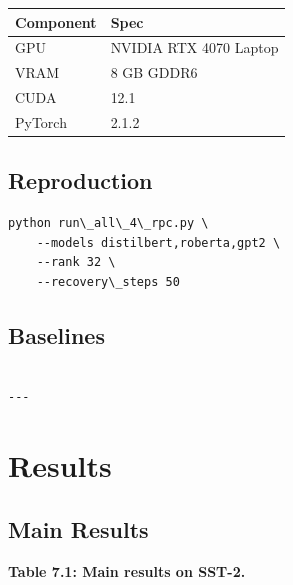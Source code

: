\begin{table}[H]
\centering
\small
\begin{tabular}{ll}
\toprule
\textbf{Component} & \textbf{Spec} \\
\midrule
GPU & NVIDIA RTX 4070 Laptop \\
VRAM & 8 GB GDDR6 \\
CUDA & 12.1 \\
PyTorch & 2.1.2 \\
\bottomrule
\end{tabular}
\end{table}

\subsection{Reproduction}

\begin{lstlisting}
python run\_all\_4\_rpc.py \
    --models distilbert,roberta,gpt2 \
    --rank 32 \
    --recovery\_steps 50
\end{lstlisting}

\subsection{Baselines}

\begin{lstlisting}

---
\end{lstlisting}


\section{Results}

\subsection{Main Results}

\textbf{Table 7.1: Main results on SST-2.}

